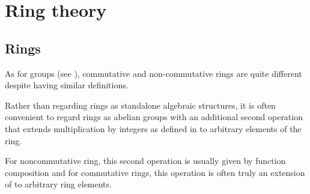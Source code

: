 \section{Ring theory}\label{sec:ring_theory}
\subsection{Rings}\label{subsec:rings}

\begin{remark}\label{rem:rings}
  As for groups (see ), commutative and non-commutative rings are quite different despite having similar definitions.

  Rather than regarding rings as standalone algebraic structures, it is often convenient to regard rings as abelian groups with an additional second operation that extends multiplication by integers as defined in  to arbitrary elements of the ring.

  For noncommutative ring, this second operation is usually given by function composition and for commutative rings, this operation is often truly an extension of  to arbitrary ring elements.
\end{remark}

